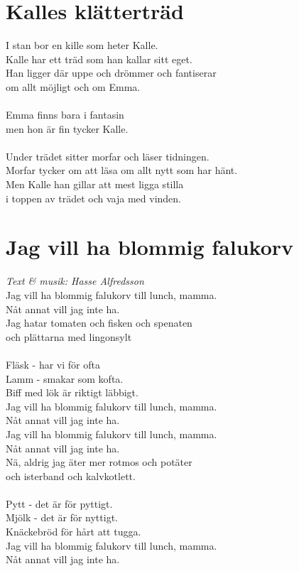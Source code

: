 \section{Kalles klätterträd}
I stan bor en kille som heter Kalle.\\
Kalle har ett träd som han kallar sitt eget.\\
Han ligger där uppe och drömmer och fantiserar\\
om allt möjligt och om Emma.\\
\\
Emma finns bara i fantasin \\
men hon är fin tycker Kalle.\\
\\
Under trädet sitter morfar och läser tidningen.\\
Morfar tycker om att läsa om allt nytt som har hänt.\\
Men Kalle han gillar att mest ligga stilla\\
i toppen av trädet och vaja med vinden.

\section{Jag vill ha blommig falukorv}
\textit{Text \& musik: Hasse Alfredsson}
\vspace{2mm}\\
Jag vill ha blommig falukorv till lunch, mamma.\\
Nåt annat vill jag inte ha.\\
Jag hatar tomaten och fisken och spenaten\\
och plättarna med lingonsylt\\
\\
Fläsk - har vi för ofta\\
Lamm - smakar som kofta.\\
Biff med lök är riktigt läbbigt.\\
Jag vill ha blommig falukorv till lunch, mamma.\\
Nåt annat vill jag inte ha.\\
\newpage
\noindent Jag vill ha blommig falukorv till lunch, mamma.\\
Nåt annat vill jag inte ha.\\
Nä, aldrig jag äter mer rotmos och potäter\\
och isterband och kalvkotlett.\\
\\
Pytt - det är för pyttigt.\\
Mjölk - det är för nyttigt.\\
Knäckebröd för hårt att tugga.\\
Jag vill ha blommig falukorv till lunch, mamma.\\
Nåt annat vill jag inte ha.

